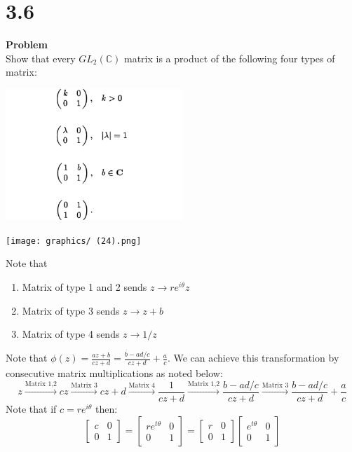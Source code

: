 \documentclass[12pt,oneside]{book}
\begin{document}
\section{3.6}
\begin{tcolorbox}[colback=blue!15]
    \textbf{Problem}\\
    Show that every $GL_2(\mathbb C)$ matrix is a product of the following four types of matrix:\\
    \begin{center}
        \includegraphics[width=0.5\textwidth]{graphics/p1.png}
    \end{center}
\end{tcolorbox}
\begin{marginfigure}%
    \texttt{[image: graphics/ (24).png]}
\end{marginfigure}%
Note that
\begin{enumerate}
    \item Matrix of type 1 and 2 sends $z\to re^{i\theta}z$
    \item Matrix of type 3 sends $z\to z+b$
    \item Matrix of type 4 sends $z\to1/z$ 
\end{enumerate}
Note that $\phi(z)=\frac{az+b}{cz+d}=\frac{b-ad/c}{cz+d}+\frac{a}{c}$. We can achieve this transformation by consecutive matrix multiplications as noted below:
$$z \xrightarrow[]{\text{Matrix 1,2}} cz\xrightarrow[]{\text{Matrix 3}} cz+d\xrightarrow[]{\text{Matrix 4}}\frac{1}{cz+d}\xrightarrow[]{\text{Matrix 1,2}}\frac{b-ad/c}{cz+d}\xrightarrow[]{\text{Matrix 3}}\frac{b-ad/c}{cz+d}+\frac{a}{c}$$
Note that if $c=re^{i\theta}$ then:
$$\begin{bmatrix}
    c &0\\
    0 &1
\end{bmatrix}=\begin{bmatrix}
    re^{t\theta} &0\\
    0 &1
\end{bmatrix}=\begin{bmatrix}
    r &0\\
    0 &1
\end{bmatrix}\begin{bmatrix}
    e^{t\theta} &0\\
    0 &1
\end{bmatrix}$$
\end{document}
